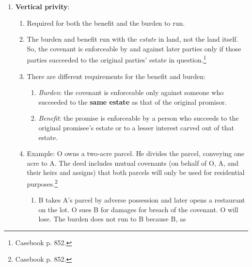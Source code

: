 \begin{enumerate}
    result?\footnote{Casebook p. 851--52.}
    \begin{enumerate}
        \item If the court requires privity of estate, the lawyer who drafted 
        the agreement could be liable for malpractice. A and B did not gain 
        privity by estate by signing the agreement. But they could have 
        established privity by transferring both lots to X (a straw), who 
        would then transfer A's lot back to A with a deed containing a promise 
        for the benefit of B's lot, and the same for B.
    \end{enumerate}
    \item \textbf{Vertical privity}:
    \begin{enumerate}
        \item Required for both the benefit and the burden to run.
        \item The burden and benefit run with the \emph{estate} in land, not 
        the land itself. So, the covenant is enforceable by and against later 
        parties only if those parties succeeded to the original parties' 
        estate in question.\footnote{Casebook p. 852.}
        \item There are different requirements for the benefit and burden:
        \begin{enumerate}
            \item \emph{Burden}: the covenant is enforceable only against 
            someone who succeeded to the \textbf{same estate} as that of the 
            original promisor. 
            \item \emph{Benefit}: the promise is enforceable by a person who 
            succeeds to the original promisee's estate or to a lesser interest 
            carved out of that estate.
        \end{enumerate}
        \item Example: O owns a two-acre parcel. He divides the parcel, 
        conveying one acre to A. The deed includes mutual covenants (on behalf 
        of O, A, and their heirs and assigns) that both parcels will only be 
        used for residential purposes.\footnote{Casebook p. 852.}
        \begin{enumerate}
            \item B takes A's parcel by adverse possession and later opens a 
            restaurant on the lot. O sues B for damages for breach of the 
            covenant. O will lose. The burden does not run to B because B, as 

\end{enumerate}
\end{enumerate}
\end{enumerate}
